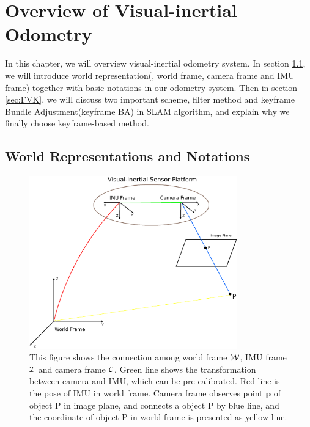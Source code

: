 \chapter{Overview of Visual-inertial Odometry}
\label{chap:Overview}

In this chapter, we will overview visual-inertial odometry system. In section \ref{sec:notations}, we will introduce world representation(\eg, world frame, camera frame and IMU frame) together with basic notations in our odometry system. Then in section \ref{sec:FVK}, we will discuss two important scheme, filter method and keyframe Bundle Adjustment(keyframe BA) in SLAM algorithm, and explain why we finally choose keyframe-based method.

\section{World Representations and Notations}
\label{sec:notations}

\begin{figure}[h]
    \centering
    \includegraphics[width=0.8\textwidth]{CONTENT/Figure/Figure2-1_World.png}
    \caption{This figure shows the connection among world frame $\mathcal{W}$, IMU frame $\mathcal{I}$ and camera frame $\mathcal{C}$. Green line shows the transformation between camera and IMU, which can be pre-calibrated. Red line is the pose of IMU in world frame. Camera frame observes point $\textbf{p}$ of object P in image plane, and connects a object P by blue line, and the coordinate of object P in world frame is presented as yellow line.}
    \label{fig:fig2-1}
\end{figure}

